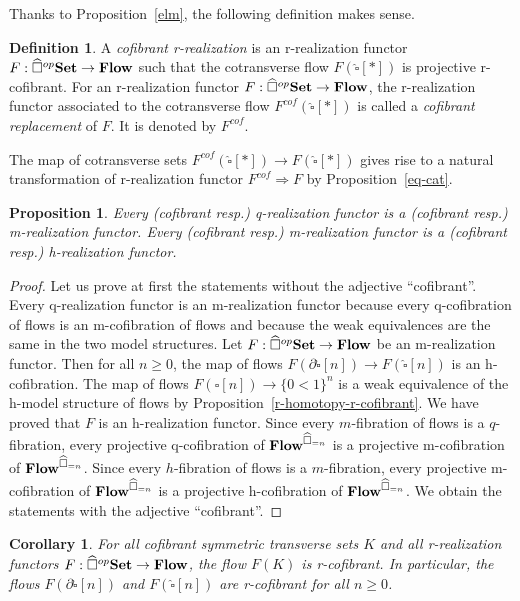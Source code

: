 \documentclass[a4paper,12pt]{amsart}
\newcommand{\de}{\partial}
\newtheorem{prop}[thm]{Proposition}
\newtheorem{cor}[thm]{Corollary}
\newcommand{\bp}{\begin{prop}}
\newcommand{\ep}{\end{prop}}
\newcommand{\bpf}{\begin{proof}}
\newcommand{\epf}{\end{proof}}
\theoremstyle{definition}
\newtheorem{defn}[thm]{Definition}
\newcommand{\bd}{\begin{defn}}
\newcommand{\ed}{\end{defn}}
\renewcommand{\geq}{\geqslant}
\newcommand{\brm}[1]{{\rm{\mathbf{#1}}}}
\newcommand{\dtop}{{\brm{Flow}}}
\newcommand{\set}{{\brm{Set}}}
\begin{document}
Thanks to Proposition~\ref{elm}, the following definition makes sense.

\bd \label{homotopy-r-realization}
A \textit{cofibrant r-realization} is an r-realization functor $F:\widehat{\square}^{op}\set\to \dtop$ such that the cotransverse flow $F(\widehat{\square}[*])$ is projective r-cofibrant. For an r-realization functor $F:\widehat{\square}^{op}\set\to \dtop$, the r-realization functor associated to the cotransverse flow $F^{cof}(\widehat{\square}[*])$ is called a \textit{cofibrant replacement} of $F$. It is denoted by $F^{cof}$. 
\ed

The map of cotransverse sets $F^{cof}(\widehat{\square}[*])\to F(\widehat{\square}[*])$ gives rise to a natural transformation of r-realization functor $F^{cof}\Rightarrow F$ by Proposition~\ref{eq-cat}.

\bp \label{qTOmTOh}
Every (cofibrant resp.) q-realization functor is a (cofibrant resp.) m-realization functor. Every (cofibrant resp.) m-realization functor is a (cofibrant resp.) h-realization functor.
\ep

\bpf
Let us prove at first the statements without the adjective ``cofibrant''. Every q-realization functor is an m-realization functor because every q-cofibration of flows is an m-cofibration of flows and because the weak equivalences are the same in the two model structures. Let $F:\widehat{\square}^{op}\set \to \dtop$ be an m-realization functor. Then for all $n\geq 0$, the map of flows $F(\de\widehat{\square}[n])\to F(\widehat{\square}[n])$ is an h-cofibration. The map of flows $F(\widehat{\square}[n])\to \{0<1\}^n$ is a weak equivalence of the h-model structure of flows by Proposition~\ref{r-homotopy-r-cofibrant}. We have proved that $F$ is an h-realization functor. Since every $m$-fibration of flows is a $q$-fibration, every projective q-cofibration of $\dtop^{\widehat{\square}_{=n}}$ is a projective m-cofibration of $\dtop^{\widehat{\square}_{=n}}$. Since every $h$-fibration of flows is a $m$-fibration, every projective m-cofibration of $\dtop^{\widehat{\square}_{=n}}$ is a projective h-cofibration of $\dtop^{\widehat{\square}_{=n}}$. We obtain the statements with the adjective ``cofibrant''.
\epf


\begin{cor} \label{cube_cofibrant}
	For all cofibrant symmetric transverse sets $K$ and all r-realization functors $F:\widehat{\square}^{op}\set \to \dtop$, the flow $F(K)$ is r-cofibrant. In particular, the flows $F(\de\widehat{\square}[n])$ and $F(\widehat{\square}[n])$ are r-cofibrant for all $n\geq 0$. 
\end{cor}
\end{document}
